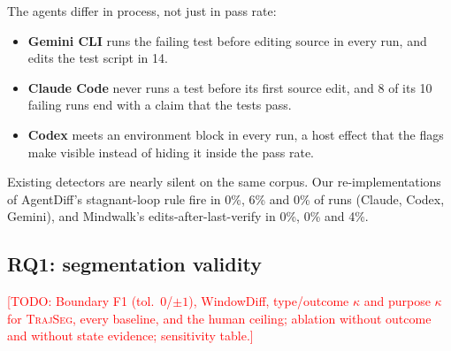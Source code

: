 \documentclass[sigconf,nonacm,10pt]{acmart}
\newcommand{\TODO}[1]{\textcolor{red}{[TODO: #1]}}
\newcommand{\tool}{\textsc{TrajSeg}}   %
\begin{document}
\begin{table}[t]
\centering
\small
\caption{Runs (of 50 per agent) showing each behaviour, from the current prototype.}
\label{tab:behaviour}
\end{table}

The agents differ in process, not just in pass rate:
\begin{itemize}
  \item \textbf{Gemini CLI} runs the failing test before editing source in every run,
        and edits the test script in 14.
  \item \textbf{Claude Code} never runs a test before its first source edit, and 8 of
        its 10 failing runs end with a claim that the tests pass.
  \item \textbf{Codex} meets an environment block in every run, a host effect that the
        flags make visible instead of hiding it inside the pass rate.
\end{itemize}

Existing detectors are nearly silent on the same corpus. Our re-implementations of
AgentDiff's stagnant-loop rule fire in 0\%, 6\% and 0\% of runs (Claude, Codex,
Gemini), and Mindwalk's edits-after-last-verify in 0\%, 0\% and 4\%.

\subsection{RQ1: segmentation validity}
\TODO{Boundary F1 (tol.\ 0/$\pm1$), WindowDiff, type/outcome $\kappa$ and purpose
$\kappa$ for \tool{}, every baseline, and the human ceiling; ablation without outcome
and without state evidence; sensitivity table.}
\end{document}
